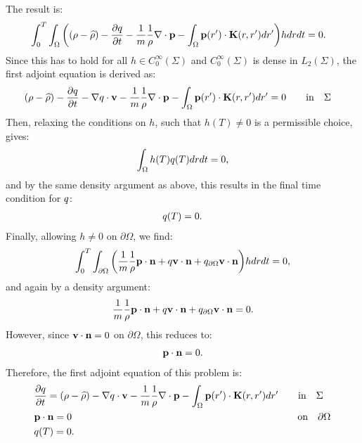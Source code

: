 The result is:
\begin{align*}
 &\int_0^T \int_\Omega \bigg((\rho - \widehat \rho) - \frac{\partial q}{\partial t} -\frac{1}{m} \frac{1}{\rho}\nabla \cdot \mathbf{p}  -  \int_\Omega  \mathbf{p}(r') \cdot\mathbf{K}(r,r')   dr'  \bigg)hdr dt =0.
\end{align*}
Since this has to hold for all $h \in C_0^\infty(\Sigma)$ and $C_0^\infty(\Sigma)$ is dense in $L_2(\Sigma)$, the first adjoint equation is derived as:
\begin{align}
&(\rho - \widehat \rho) - \frac{\partial q}{\partial t} - \nabla q \cdot \mathbf{v} -\frac{1}{m} \frac{1}{\rho}\nabla \cdot \mathbf{p}   -  \int_\Omega  \mathbf{p}(r') \cdot\mathbf{K}(r,r')   dr' = 0  \qquad \text{in} \quad \Sigma \notag
\end{align}
Then, relaxing the conditions on $h$, such that $h(T) \neq 0$ is a permissible choice, gives:
\begin{align*}
\int_\Omega h(T) q(T) dr dt=0,
\end{align*}
and by the same density argument as above, this results in the final time condition for $q$:
\begin{align*}
q(T) = {0} .
\end{align*}
Finally, allowing $h \neq 0$ on $\partial\Omega$, we find:
\begin{align*}
\int_0^T \int_{\partial \Omega} \bigg( \frac{1}{m} \frac{1}{\rho} \mathbf{p} \cdot \mathbf{n}  + q \mathbf{v} \cdot \mathbf{n}   +{q}_{\partial \Omega} \mathbf{v} \cdot \mathbf{n}\bigg)h  dr dt=0,
\end{align*}
and again by a density argument:
\begin{align*}
\frac{1}{m} \frac{1}{\rho} \mathbf{p} \cdot \mathbf{n}  +  q \mathbf{v} \cdot \mathbf{n}   +{q}_{\partial \Omega} \mathbf{v} \cdot \mathbf{n} = 0.
\end{align*}
However, since $\mathbf{v} \cdot \mathbf{n} =0$ on $ \partial\Omega$,  this reduces to:
\begin{align*}
\mathbf{p} \cdot \mathbf{n}  = 0.
\end{align*}
Therefore, the first adjoint equation of this problem is:
\begin{align}
\label{eqn:INAdj1}
&  \frac{\partial q}{\partial t}  = (\rho - \widehat \rho)- \nabla q \cdot \mathbf{v} -\frac{1}{m} \frac{1}{\rho}\nabla \cdot \mathbf{p} -  \int_\Omega  \mathbf{p}(r') \cdot\mathbf{K}(r,r')   dr'  \qquad \text{in} \quad \Sigma \\
&\mathbf{p} \cdot \mathbf{n}  = 0 \qquad \qquad\qquad \qquad\qquad \qquad\qquad \qquad\qquad \qquad\qquad\quad \text{on} \quad \partial \Omega \notag \\
 &q(T) = {0} . \notag
\end{align}


